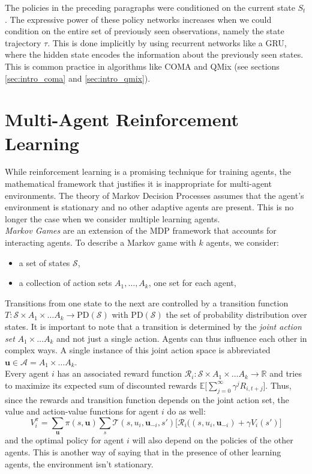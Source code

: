 The policies in the preceding paragraphs were conditioned on the current state $S_t$. The expressive power of these policy networks increases when we could condition on the entire set of previously seen observations, namely the state trajectory $\tau$. This is done implicitly by using recurrent networks like a GRU, where the hidden state encodes the information about the previously seen states. This is common practice in algorithms like COMA and QMix (see sections \ref{sec:intro_coma} and \ref{sec:intro_qmix}).
\section{Multi-Agent Reinforcement Learning}
\label{sec:intro_marl}
While reinforcement learning is a promising technique for training agents, the mathematical framework that justifies it is inappropriate for multi-agent environments. The theory of Markov Decision Processes assumes that the agent's environment is stationary and no other adaptive agents are present. This is no longer the case when we consider multiple learning agents.\\

\emph{Markov Games} \cite{littman1994markov} are an extension of the MDP framework that accounts for interacting agents. To describe a Markov game with $k$ agents, we consider:
\begin{itemize}
    \item a set of states $\mathcal{S}$,
    \item a collection of action sets $A_1, \ldots, A_k$, one set for each agent,
\end{itemize}
Transitions from one state to the next are controlled by a transition function $T: \mathcal{S} \times A_1 \times \ldots A_k \rightarrow \text{PD}(\mathcal{S})$ with $\text{PD}(\mathcal{S})$ the set of probability distribution over states. It is important to note that a transition is determined by the \emph{joint action set} $A_1 \times \ldots A_k$ and not just a single action. Agents can thus influence each other in complex ways. A single instance of this joint action space is abbreviated $\bm{u} \in \mathcal{A} = A_1 \times \ldots A_k$. \\

Every agent $i$ has an associated reward function $\mathcal{R}_i: \mathcal{S} \times A_1 \times \ldots A_k \rightarrow \mathbb{R}$ and tries to maximize its expected sum of discounted rewards $\mathbb{E}\Big [ \sum_{j=0}^{\infty} \gamma^j R_{i, t+j} \Big ]$. Thus, since the rewards and transition function depends on the joint action set, the value and action-value functions for agent $i$ do as well:
\begin{equation}
    V_i^{\pi} = \sum_{\bm{u}}\pi(s, \bm{u}) \sum_{s} \mathcal{T}(s, u_i, \bm{u}_{-i}, s') \big [\mathcal{R}_i((s, u_i, \bm{u}_{-i}) + \gamma V_i(s')]
\end{equation}
and the optimal policy for agent $i$ will also depend on the policies of the other agents. This is another way of saying that in the presence of other learning agents, the environment isn't stationary.\\

